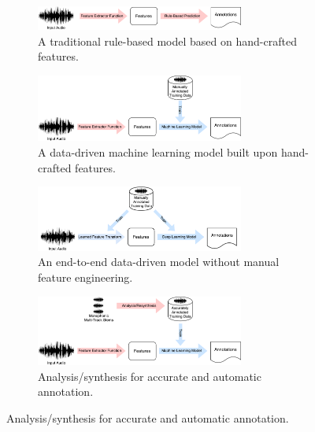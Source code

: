 \begin{figure}
	\begin{subfigure}[b]{\textwidth}
		\centering
		\includegraphics[width=0.75\textwidth]{paradigms-1-manual.pdf}
		\caption{A traditional rule-based model based on hand-crafted features.}
		\label{}
	\end{subfigure}
	\begin{subfigure}[b]{\textwidth}
		\centering
		\vspace{1em}
		\includegraphics[width=0.75\textwidth]{paradigms-2-features.pdf}
		\caption{A data-driven machine learning model built upon hand-crafted features.}
		\label{}
	\end{subfigure}
	\begin{subfigure}[b]{\textwidth}
		\centering
		\vspace{1em}
		\includegraphics[width=0.75\textwidth]{paradigms-3-end-to-end.pdf}
		\caption{An end-to-end data-driven model without manual feature engineering.}
		\label{}
	\end{subfigure}
	\begin{subfigure}[b]{\textwidth}
		\centering
		\vspace{1em}
		\includegraphics[width=0.75\textwidth]{paradigms-4-analysis-synthesis.pdf}
		\caption{Analysis/synthesis \cite{salamon2017analysis} for accurate and automatic annotation.}

\end{subfigure}
\end{figure}
